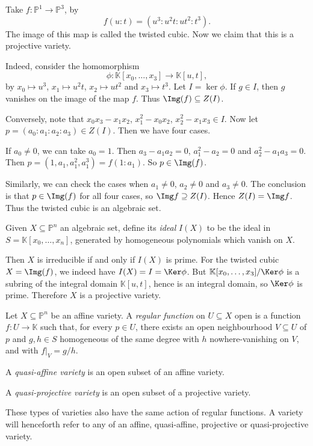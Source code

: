 \documentclass[12pt]{article}
\begin{document}
\begin{exbox}
	Take $f : \mathbb{P}^1 \to \mathbb{P}^3$, by
	\[
	f(u : t) = (u^3 : u^2 t : ut^2 : t^3).
	\]
	The image of this map is called the twisted cubic. Now we claim that this is a projective variety.

	Indeed, consider the homomorphism
	\[
		\phi : \mathbb{K}[x_0, \ldots, x_3] \to \mathbb{K}[u, t],
	\]
	by $x_0 \mapsto u^3$, $x_1 \mapsto u^2t$, $x_2 \mapsto ut^2$ and $x_3 \mapsto t^3$. Let $I = \ker \phi$. If $g \in I$, then $g$ vanishes on the image of the map $f$. Thus $\Img(f) \subseteq Z(I)$.

	Conversely, note that $x_0 x_3 - x_1 x_2$, $x_1^2 - x_0x_2$, $x_2^2 - x_1x_3 \in I$. Now let $p = (a_0 : a_1 : a_2: a_3) \in Z(I)$. Then we have four cases.

	If $a_0 \neq 0$, we can take $a_0 = 1$. Then $a_3 - a_1 a_2 = 0$, $a_1^2 - a_2 = 0$ and $a_2^2 - a_1a_3= 0$. Then $p = (1, a_1, a_1^2, a_1^3) = f(1 : a_1)$. So $p \in \Img(f)$.

	Similarly, we can check the cases when $a_1 \neq 0$, $a_2 \neq 0$ and $a_3 \neq 0$. The conclusion is that $p \in \Img(f)$ for all four cases, so $\Img f \supseteq Z(I)$. Hence $Z(I) = \Img f$. Thus the twisted cubic is an algebraic set.
\end{exbox}

Given $X \subseteq \mathbb{P}^n$ an algebraic set, define its \emph{ideal} $I(X)$ to be the ideal in $S = \mathbb{K}[x_0, \ldots, x_n]$, generated by homogeneous polynomials which vanish on $X$.

Then $X$ is irreducible if and only if $I(X)$ is prime. For the twisted cubic $X = \Img(f)$, we indeed have $I(X) = I = \Ker \phi$. But $\mathbb{K}[x_0, \ldots, x_3]/\Ker \phi$ is a subring of the integral domain $\mathbb{K}[u, t]$, hence is an integral domain, so $\Ker \phi$ is prime. Therefore $X$ is a projective variety.

\begin{definition}
	Let $X \subseteq \mathbb{P}^n$ be an affine variety. A \emph{regular function} on $U \subseteq X$ open is a function $f : U \to \mathbb{K}$ such that, for every $p \in U$, there exists an open neighbourhood $V \subseteq U$ of $p$ and $g, h \in S$ homogeneous of the same degree with $h$ nowhere-vanishing on $V$, and with $f|_V = g/h$.
\end{definition}

\begin{definition}
	A \emph{quasi-affine variety} is an open subset of an affine variety.

	A \emph{quasi-projective variety} is an open subset of a projective variety.

	These types of varieties also have the same action of regular functions. A variety will henceforth refer to any of an affine, quasi-affine, projective or quasi-projective variety.
\end{definition}
\end{document}
